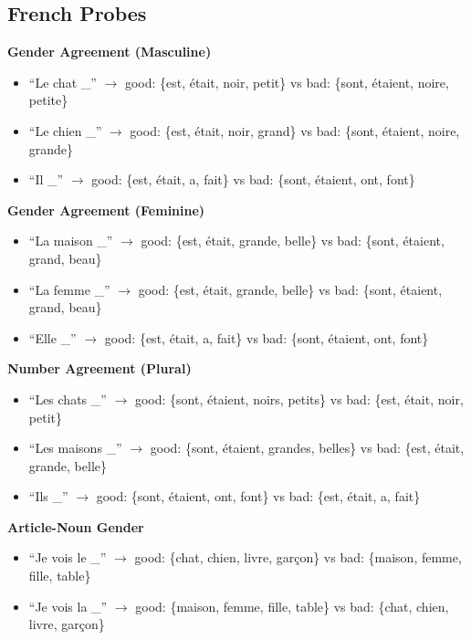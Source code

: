 \documentclass[11pt,a4paper]{article}
\begin{document}
\subsection{French Probes}

\textbf{Gender Agreement (Masculine)}
\begin{itemize}
    \item ``Le chat \_'' $\rightarrow$ good: \{est, \'{e}tait, noir, petit\} vs bad: \{sont, \'{e}taient, noire, petite\}
    \item ``Le chien \_'' $\rightarrow$ good: \{est, \'{e}tait, noir, grand\} vs bad: \{sont, \'{e}taient, noire, grande\}
    \item ``Il \_'' $\rightarrow$ good: \{est, \'{e}tait, a, fait\} vs bad: \{sont, \'{e}taient, ont, font\}
\end{itemize}

\textbf{Gender Agreement (Feminine)}
\begin{itemize}
    \item ``La maison \_'' $\rightarrow$ good: \{est, \'{e}tait, grande, belle\} vs bad: \{sont, \'{e}taient, grand, beau\}
    \item ``La femme \_'' $\rightarrow$ good: \{est, \'{e}tait, grande, belle\} vs bad: \{sont, \'{e}taient, grand, beau\}
    \item ``Elle \_'' $\rightarrow$ good: \{est, \'{e}tait, a, fait\} vs bad: \{sont, \'{e}taient, ont, font\}
\end{itemize}

\textbf{Number Agreement (Plural)}
\begin{itemize}
    \item ``Les chats \_'' $\rightarrow$ good: \{sont, \'{e}taient, noirs, petits\} vs bad: \{est, \'{e}tait, noir, petit\}
    \item ``Les maisons \_'' $\rightarrow$ good: \{sont, \'{e}taient, grandes, belles\} vs bad: \{est, \'{e}tait, grande, belle\}
    \item ``Ils \_'' $\rightarrow$ good: \{sont, \'{e}taient, ont, font\} vs bad: \{est, \'{e}tait, a, fait\}
\end{itemize}

\textbf{Article-Noun Gender}
\begin{itemize}
    \item ``Je vois le \_'' $\rightarrow$ good: \{chat, chien, livre, gar\c{c}on\} vs bad: \{maison, femme, fille, table\}
    \item ``Je vois la \_'' $\rightarrow$ good: \{maison, femme, fille, table\} vs bad: \{chat, chien, livre, gar\c{c}on\}
\end{itemize}
\end{document}
